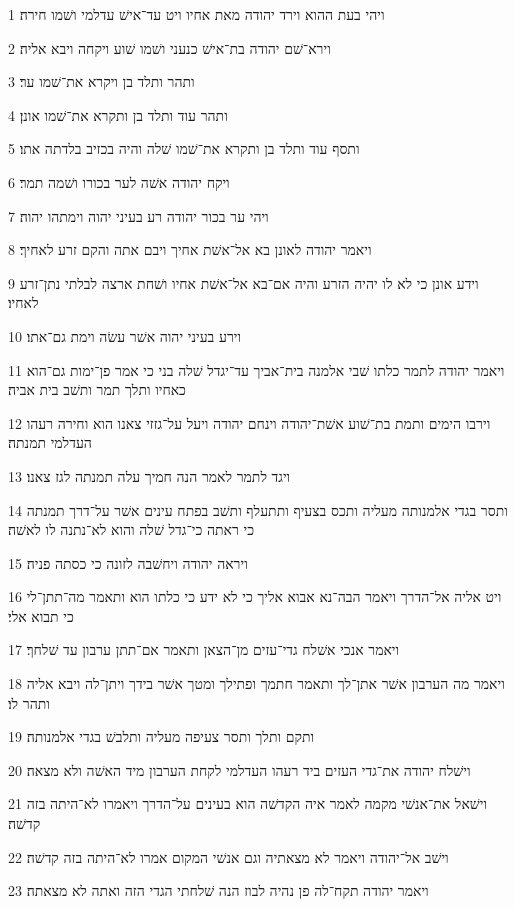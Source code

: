 \par 1 ויהי בעת ההוא וירד יהודה מאת אחיו ויט עד־אישׁ עדלמי ושׁמו חירה׃
\par 2 וירא־שׁם יהודה בת־אישׁ כנעני ושׁמו שׁוע ויקחה ויבא אליה׃
\par 3 ותהר ותלד בן ויקרא את־שׁמו ער׃
\par 4 ותהר עוד ותלד בן ותקרא את־שׁמו אונן׃
\par 5 ותסף עוד ותלד בן ותקרא את־שׁמו שׁלה והיה בכזיב בלדתה אתו׃
\par 6 ויקח יהודה אשׁה לער בכורו ושׁמה תמר׃
\par 7 ויהי ער בכור יהודה רע בעיני יהוה וימתהו יהוה׃
\par 8 ויאמר יהודה לאונן בא אל־אשׁת אחיך ויבם אתה והקם זרע לאחיך׃
\par 9 וידע אונן כי לא לו יהיה הזרע והיה אם־בא אל־אשׁת אחיו ושׁחת ארצה לבלתי נתן־זרע לאחיו׃
\par 10 וירע בעיני יהוה אשׁר עשׂה וימת גם־אתו׃
\par 11 ויאמר יהודה לתמר כלתו שׁבי אלמנה בית־אביך עד־יגדל שׁלה בני כי אמר פן־ימות גם־הוא כאחיו ותלך תמר ותשׁב בית אביה׃
\par 12 וירבו הימים ותמת בת־שׁוע אשׁת־יהודה וינחם יהודה ויעל על־גזזי צאנו הוא וחירה רעהו העדלמי תמנתה׃
\par 13 ויגד לתמר לאמר הנה חמיך עלה תמנתה לגז צאנו׃
\par 14 ותסר בגדי אלמנותה מעליה ותכס בצעיף ותתעלף ותשׁב בפתח עינים אשׁר על־דרך תמנתה כי ראתה כי־גדל שׁלה והוא לא־נתנה לו לאשׁה׃
\par 15 ויראה יהודה ויחשׁבה לזונה כי כסתה פניה׃
\par 16 ויט אליה אל־הדרך ויאמר הבה־נא אבוא אליך כי לא ידע כי כלתו הוא ותאמר מה־תתן־לי כי תבוא אלי׃
\par 17 ויאמר אנכי אשׁלח גדי־עזים מן־הצאן ותאמר אם־תתן ערבון עד שׁלחך׃
\par 18 ויאמר מה הערבון אשׁר אתן־לך ותאמר חתמך ופתילך ומטך אשׁר בידך ויתן־לה ויבא אליה ותהר לו׃
\par 19 ותקם ותלך ותסר צעיפה מעליה ותלבשׁ בגדי אלמנותה׃
\par 20 וישׁלח יהודה את־גדי העזים ביד רעהו העדלמי לקחת הערבון מיד האשׁה ולא מצאה׃
\par 21 וישׁאל את־אנשׁי מקמה לאמר איה הקדשׁה הוא בעינים על־הדרך ויאמרו לא־היתה בזה קדשׁה׃
\par 22 וישׁב אל־יהודה ויאמר לא מצאתיה וגם אנשׁי המקום אמרו לא־היתה בזה קדשׁה׃
\par 23 ויאמר יהודה תקח־לה פן נהיה לבוז הנה שׁלחתי הגדי הזה ואתה לא מצאתה׃
